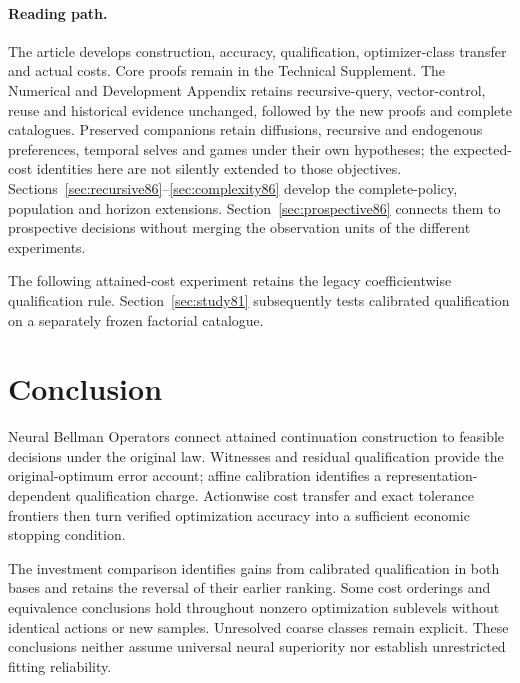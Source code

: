 \documentclass[ecta,nameyear,draft]{econsocart}
\begin{document}
\paragraph{Reading path.}
The article develops construction, accuracy, qualification, optimizer-class transfer and actual costs. Core proofs remain in the Technical Supplement. The Numerical and Development Appendix retains recursive-query, vector-control, reuse and historical evidence unchanged, followed by the new proofs and complete catalogues. Preserved companions retain diffusions, recursive and endogenous preferences, temporal selves and games under their own hypotheses; the expected-cost identities here are not silently extended to those objectives. Sections~\ref{sec:recursive86}--\ref{sec:complexity86} develop the complete-policy, population and horizon extensions. Section~\ref{sec:prospective86} connects them to prospective decisions without merging the observation units of the different experiments.













\noindent The following attained-cost experiment retains the legacy coefficientwise qualification rule. Section~\ref{sec:study81} subsequently tests calibrated qualification on a separately frozen factorial catalogue.






\section{Conclusion}\label{sec:conclusion65}
Neural Bellman Operators connect attained continuation construction to feasible decisions under the original law. Witnesses and residual qualification provide the original-optimum error account; affine calibration identifies a representation-dependent qualification charge. Actionwise cost transfer and exact tolerance frontiers then turn verified optimization accuracy into a sufficient economic stopping condition.

The investment comparison identifies gains from calibrated qualification in both bases and retains the reversal of their earlier ranking. Some cost orderings and equivalence conclusions hold throughout nonzero optimization sublevels without identical actions or new samples. Unresolved coarse classes remain explicit. These conclusions neither assume universal neural superiority nor establish unrestricted fitting reliability.
\end{document}
